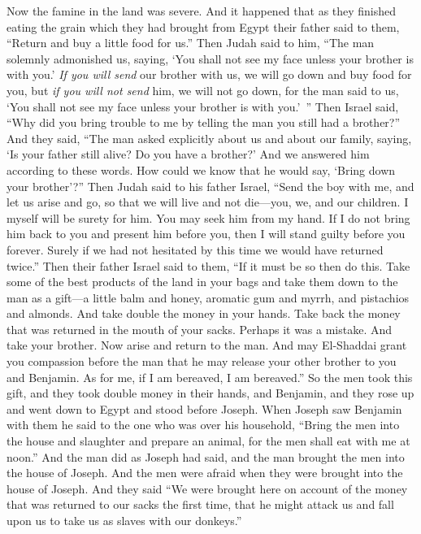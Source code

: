 \begin{biblechapter} %
 Now the famine in the land was severe.
\verse And it happened that as they finished eating the grain which they had brought from Egypt their father said to them, “Return and buy a little food for us.”
\verse Then Judah said to him, “The man solemnly admonished us, saying, ‘You shall not see my face unless your brother is with you.’
\verse \textit{If you will send} our brother with us, we will go down and buy food for you,
\verse but \textit{if you will not send} him, we will not go down, for the man said to us, ‘You shall not see my face unless your brother is with you.’ ”
\verse Then Israel said, “Why did you bring trouble to me by telling the man you still had a brother?”
\verse And they said, “The man asked explicitly about us and about our family, saying, ‘Is your father still alive? Do you have a brother?’ And we answered him according to these words. How could we know that he would say, ‘Bring down your brother’?”
\verse Then Judah said to his father Israel, “Send the boy with me, and let us arise and go, so that we will live and not die—you, we, and our children.
\verse I myself will be surety for him. You may seek him from my hand. If I do not bring him back to you and present him before you, then I will stand guilty before you forever.
\verse Surely if we had not hesitated by this time we would have returned twice.”
\verse Then their father Israel said to them, “If it must be so then do this. Take some of the best products of the land in your bags and take them down to the man as a gift—a little balm and honey, aromatic gum and myrrh, and pistachios and almonds.
\verse And take double the money in your hands. Take back the money that was returned in the mouth of your sacks. Perhaps it was a mistake.
\verse And take your brother. Now arise and return to the man.
\verse And may El-Shaddai grant you compassion before the man that he may release your other brother to you and Benjamin. As for me, if I am bereaved, I am bereaved.”
\verse So the men took this gift, and they took double money in their hands, and Benjamin, and they rose up and went down to Egypt and stood before Joseph.
\verse When Joseph saw Benjamin with them he said to the one who was over his household, “Bring the men into the house and slaughter and prepare an animal, for the men shall eat with me at noon.”
\verse And the man did as Joseph had said, and the man brought the men into the house of Joseph.
\verse And the men were afraid when they were brought into the house of Joseph. And they said “We were brought here on account of the money that was returned to our sacks the first time, that he might attack us and fall upon us to take us as slaves with our donkeys.”

\end{biblechapter}
